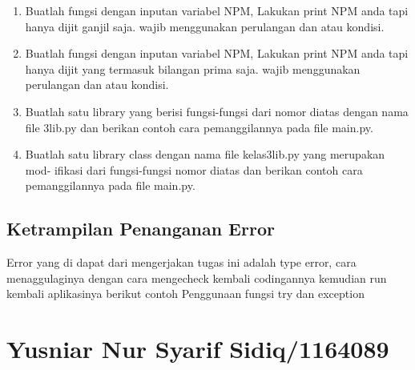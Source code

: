 \begin{enumerate}
    \item Buatlah fungsi dengan inputan variabel NPM, Lakukan print NPM anda tapi
    hanya dijit ganjil saja. wajib menggunakan perulangan dan atau kondisi.
    

    \item Buatlah fungsi dengan inputan variabel NPM, Lakukan print NPM anda tapi
    hanya dijit yang termasuk bilangan prima saja. wajib menggunakan perulangan
    dan atau kondisi.
    

    \item Buatlah satu library yang berisi fungsi-fungsi dari nomor diatas dengan nama
    file 3lib.py dan berikan contoh cara pemanggilannya pada file main.py.
    

    \item Buatlah satu library class dengan nama file kelas3lib.py yang merupakan mod-
    ifikasi dari fungsi-fungsi nomor diatas dan berikan contoh cara pemanggilannya
    pada file main.py.
    
    
\end{enumerate}
\subsection{Ketrampilan Penanganan Error}
Error yang di dapat dari mengerjakan tugas ini adalah type error, cara menaggulaginya dengan cara mengecheck kembali codingannya
kemudian run kembali aplikasinya
berikut contoh Penggunaan fungsi try dan exception


\section{Yusniar Nur Syarif Sidiq/1164089}
